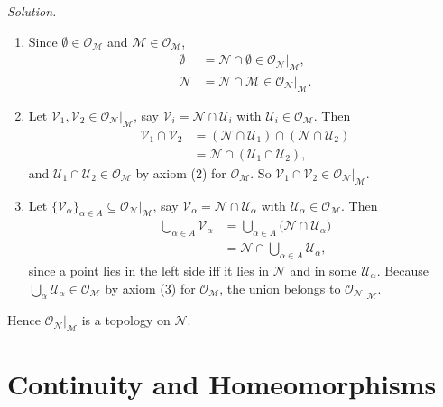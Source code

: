\documentclass[11pt]{article}
\begin{document}
\medskip
\noindent\textit{Solution.}
\begin{enumerate}[label=(\arabic*)]
  \item Since $\emptyset\in\mathcal O_{\mathcal M}$ and $\mathcal M\in\mathcal O_{\mathcal M}$,
  \begin{align*}
  \emptyset&=\mathcal N\cap\emptyset\in\mathcal O_{\mathcal N}|_{\mathcal M},\\
  \mathcal N&=\mathcal N\cap\mathcal M\in\mathcal O_{\mathcal N}|_{\mathcal M}.
  \end{align*}
  \item Let $\mathcal V_1,\mathcal V_2\in\mathcal O_{\mathcal N}|_{\mathcal M}$, say $\mathcal V_i=\mathcal N\cap\mathcal U_i$ with $\mathcal U_i\in\mathcal O_{\mathcal M}$. Then
  \begin{align*}
  \mathcal V_1\cap\mathcal V_2
  &=(\mathcal N\cap\mathcal U_1)\cap(\mathcal N\cap\mathcal U_2)\\
  &=\mathcal N\cap(\mathcal U_1\cap\mathcal U_2),
  \end{align*}
  and $\mathcal U_1\cap\mathcal U_2\in\mathcal O_{\mathcal M}$ by axiom (2) for $\mathcal O_{\mathcal M}$. So $\mathcal V_1\cap\mathcal V_2\in\mathcal O_{\mathcal N}|_{\mathcal M}$.
  \item Let $\{\mathcal V_\alpha\}_{\alpha\in A}\subseteq\mathcal O_{\mathcal N}|_{\mathcal M}$, say $\mathcal V_\alpha=\mathcal N\cap\mathcal U_\alpha$ with $\mathcal U_\alpha\in\mathcal O_{\mathcal M}$. Then
  \begin{align*}
  \bigcup_{\alpha\in A}\mathcal V_\alpha
  &=\bigcup_{\alpha\in A}\big(\mathcal N\cap\mathcal U_\alpha\big)\\
  &=\mathcal N\cap\bigcup_{\alpha\in A}\mathcal U_\alpha,
  \end{align*}
  since a point lies in the left side iff it lies in $\mathcal N$ and in some $\mathcal U_\alpha$. Because $\bigcup_\alpha\mathcal U_\alpha\in\mathcal O_{\mathcal M}$ by axiom (3) for $\mathcal O_{\mathcal M}$, the union belongs to $\mathcal O_{\mathcal N}|_{\mathcal M}$.
\end{enumerate}
Hence $\mathcal O_{\mathcal N}|_{\mathcal M}$ is a topology on $\mathcal N$.

\section{Continuity and Homeomorphisms}
\end{document}
